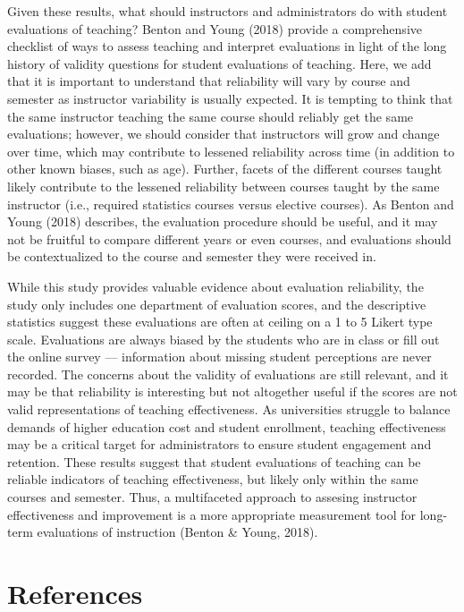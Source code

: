 \documentclass[
  man]{apa7}
\begin{document}
Given these results, what should instructors and administrators do with
student evaluations of teaching? Benton and Young (2018) provide a comprehensive
checklist of ways to assess teaching and interpret evaluations in light
of the long history of validity questions for student evaluations of
teaching. Here, we add that it is important to understand that
reliability will vary by course and semester as instructor variability
is usually expected. It is tempting to think that the same instructor
teaching the same course should reliably get the same evaluations;
however, we should consider that instructors will grow and change over
time, which may contribute to lessened reliability across time (in
addition to other known biases, such as age). Further, facets of the
different courses taught likely contribute to the lessened reliability
between courses taught by the same instructor (i.e., required statistics
courses versus elective courses). As Benton and Young (2018) describes, the
evaluation procedure should be useful, and it may not be fruitful to
compare different years or even courses, and evaluations should be
contextualized to the course and semester they were received in.

While this study provides valuable evidence about evaluation
reliability, the study only includes one department of evaluation
scores, and the descriptive statistics suggest these evaluations are
often at ceiling on a 1 to 5 Likert type scale. Evaluations are always
biased by the students who are in class or fill out the online survey
--- information about missing student perceptions are never recorded.
The concerns about the validity of evaluations are still relevant, and
it may be that reliability is interesting but not altogether useful if
the scores are not valid representations of teaching effectiveness. As
universities struggle to balance demands of higher education cost and
student enrollment, teaching effectiveness may be a critical target for
administrators to ensure student engagement and retention. These results
suggest that student evaluations of teaching can be reliable indicators
of teaching effectiveness, but likely only within the same courses and
semester. Thus, a multifaceted approach to assesing instructor
effectiveness and improvement is a more appropriate measurement tool for
long-term evaluations of instruction (Benton \& Young, 2018).

\newpage

\hypertarget{references}{%
\section{References}\label{references}}
\end{document}

